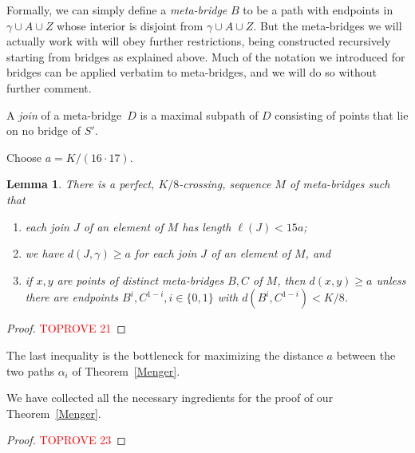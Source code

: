 \documentclass[a4paper]{article}
\newcommand{\comment}[1]{}
\newcommand{\defi}[1]{{\color{darkgray}\emph{#1}}}
\newtheorem{proposition}{Proposition}[section]
\newtheorem{lemma}[proposition]{Lemma}
\newcommand{\Tr}[1]{Theorem~\ref{#1}}
\newcommand{\st}{such that}
\newcommand{\mb}{meta-bridge}
\begin{document}
Formally, we can simply define a \defi{\mb} $B$ to be a path
with endpoints in $\gamma \cup A \cup Z$ whose interior is disjoint from $\gamma \cup A \cup Z$. But the \mb s we will actually work with will obey further restrictions, being constructed recursively starting from bridges as explained above. Much of the notation we introduced for bridges can be applied verbatim to \mb s, and we will do so without further comment.

A \defi{join} of a \mb\ $D$ is a maximal subpath of $D$ consisting of points that lie on no bridge of $S'$. 

Choose $a=  K/(16\cdot 17)$. 
\begin{lemma} \label{meta} 
There is a perfect, $K/8$-crossing, sequence $M$ of \mb s \st\
\begin{enumerate}
\item \label{m ii} each join $J$ of an element of $M$ has length $\ell(J) < 15a$; 
\item \label{m iii} we have $d(J, \gamma)\geq a$ for each join $J$ of an element of $M$, and
\item \label{m i} if $x,y$ are points of distinct \mb s $B,C$ of $M$, then $d(x,y)\geq a$ unless there are endpoints $B^i,C^{1-i}, i\in \{0,1\}$ with $d(B^i,C^{1-i})<K/8$. \end{enumerate}
\end{lemma}
\begin{proof}\textcolor{red}{TOPROVE 21}\end{proof}

 The last inequality is the bottleneck for maximizing the distance $a$ between the two paths $\alpha_i$ of \Tr{Menger}.

\bigskip

\comment{
\begin{proposition} \label{}  
Let $x,y$ be points of meta-bridges $X,Y$ \st\ $d(x,\gamma), d(y,\gamma)\leq r$. Then $d(x,y)\geq a$ unless there are endpoints $x',y'$ of $X,Y$ \st\ $d(x',y')\leq ...$
\end{proposition}
\begin{proof}\textcolor{red}{TOPROVE 22}\end{proof}
}

We have collected all the necessary ingredients for the proof of our \Tr{Menger}.

\begin{proof}\textcolor{red}{TOPROVE 23}\end{proof}
\end{document}
